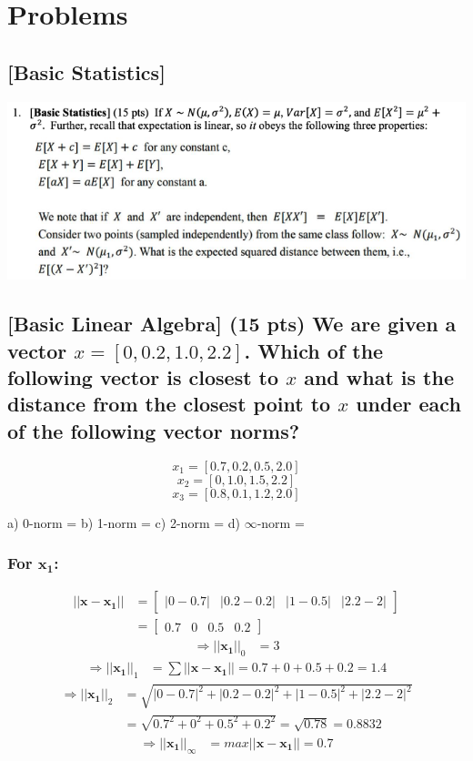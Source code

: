 \section{Problems}

\subsection{[Basic Statistics]}

\includegraphics[width=1\textwidth]{media/hw2_q1.png}

\subsection{[Basic Linear Algebra] (15 pts) We are given a vector $x = [0, 0.2, 1.0, 2.2]$. Which of the following vector is closest to $x$ and what is the distance from the closest point to $x$ under each of the following vector norms?}

$$x_1 = [0.7, 0.2, 0.5, 2.0]$$
$$x_2 = [0, 1.0, 1.5, 2.2]$$
$$x_3 = [0.8, 0.1, 1.2, 2.0]$$

a) 0-norm =
b) 1-norm =
c) 2-norm =
d) $\infty$-norm =

\subsubsection{For $\mathbf{x_1}$:}
\begin{align}
    ||\mathbf{x} - \mathbf{x_1}|| &= 
    \begin{bmatrix}
        |0 - 0.7| & |0.2 - 0.2| & |1 - 0.5| & |2.2 - 2|
    \end{bmatrix} \nonumber \\
    &= 
    \begin{bmatrix}
        0.7 & 0 & 0.5 & 0.2
    \end{bmatrix} 
\end{align}
\begin{align}
    \Rightarrow ||\mathbf{x_1}||_0 &= 3
\end{align}
\begin{align}
    \Rightarrow  ||\mathbf{x_1}||_1 &= \sum ||\mathbf{x} - \mathbf{x_1}|| = 0.7 + 0 + 0.5 + 0.2 = 1.4
\end{align}
\begin{align}
    \Rightarrow ||\mathbf{x_1}||_2 &= \sqrt{|0 - 0.7|^2 + |0.2 - 0.2|^2 + |1 - 0.5|^2 + |2.2 - 2|^2} \nonumber \\
    &= \sqrt{0.7^2 + 0^2 + 0.5^2 + 0.2^2} = \sqrt{0.78} = 0.8832
\end{align}
\begin{align}
    \Rightarrow ||\mathbf{x_1}||_{\infty} &= max ||\mathbf{x} - \mathbf{x_1}|| = 0.7
\end{align}

